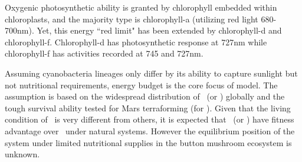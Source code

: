 \documentclass[../thesis.tex]{subfiles} %
\begin{document}
  Oxygenic photosynthetic ability is granted by chlorophyll embedded within chloroplasts, and the majority type is chlorophyll-a (utilizing red light 680-700nm).  Yet, this energy ``red limit" has been extended by chlorophyll-d and chlorophyll-f.  Chlorophyll-d has photosynthetic response at 727nm while chlorophyll-f has activities recorded at 745 and 727nm.
  
  Assuming cyanobacteria lineages only differ by its ability to capture sunlight but not nutritional requirements,\autocite{giraldo2014plant} energy budget is the core focus of model.  The assumption is based on the widespread distribution of \Ss\ (or \As) globally\autocite{sawa2017electricity,joshi2018bacterial} and the tough survival ability tested for Mars terraforming (for \Cs).\autocite{baque2013boss}  Given that the living condition of \Ct\ is very different from others,\autocite{nurnberg2018photochemistry} it is expected that \As\ (or \Ss) have fitness advantage over \Cs\ under natural systems.  However the equilibrium position of the system under limited nutritional supplies in the button mushroom ecosystem\autocite{joshi2018bacterial} is unknown.
\end{document}
